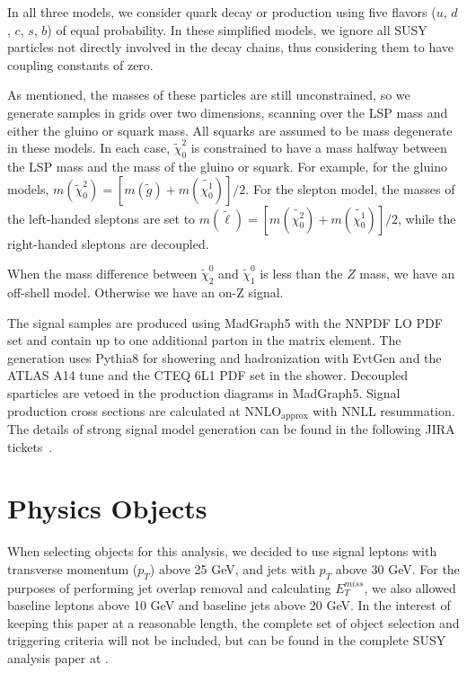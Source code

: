In all three models, we consider quark decay or production using five flavors ($u$, $d$, $c$, $s$, $b$) of equal probability. In these simplified models, we ignore all SUSY particles not directly involved in the decay chains, thus considering them to have coupling constants of zero.

As mentioned, the masses of these particles are still unconstrained, so we generate samples in grids over two dimensions, scanning over the LSP mass and either the gluino or squark mass. All squarks are assumed to be mass degenerate in these models. In each case, $\tilde{\chi}_0^2$ is constrained to have a mass halfway between the LSP mass and the mass of the gluino or squark. For example, for the gluino models, $m(\tilde{\chi}_0^2) = [m(\tilde{g})+m(\tilde{\chi^1_0})]/2$. For the slepton model, the masses of the left-handed sleptons are set to $m(\tilde{\ell}) = [m(\tilde{\chi^2_0})+m(\tilde{\chi^1_0})]/2$, while the right-handed sleptons are decoupled.

When the mass difference between $\tilde{\chi}_{2}^{0}$ and $\tilde{\chi}_{1}^{0}$ is less than the $Z$ mass, we have an off-shell model. Otherwise we have an on-Z signal.

The signal samples are produced using MadGraph5 with the NNPDF LO PDF set and contain up to one additional parton in the matrix element. The generation uses Pythia8 for showering and hadronization with EvtGen and the ATLAS A14 tune and the CTEQ 6L1 PDF set in the shower. Decoupled sparticles are vetoed in the production diagrams in MadGraph5. Signal production cross sections are calculated at NNLO$_\text{approx}$ with NNLL resummation. The details of strong signal model generation can be found in the following JIRA tickets~\cite{JIRAGluinoSLN, JIRAGluinoZ, JIRASleptonZ}.


\section{Physics Objects}

When selecting objects for this analysis, we decided to use signal leptons with transverse momentum ($p_T$) above 25 GeV, and jets with $p_T$ above 30 GeV. For the purposes of performing jet overlap removal and calculating $E_T^{miss}$, we also allowed baseline leptons above 10 GeV and baseline jets above 20 GeV. In the interest of keeping this paper at a reasonable length, the complete set of object selection and triggering criteria will not be included, but can be found in the complete SUSY analysis paper at \cite{SUSY_2l2j}.

